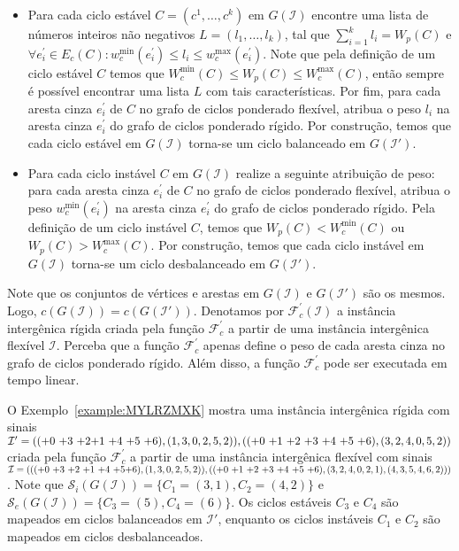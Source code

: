 \begin{itemize}
  \item Para cada ciclo estável $C=(c^1,\dots,c^k)$ em $G(\mathcal{I})$ encontre uma lista de números inteiros não negativos $L=(l_1,\dots,l_k)$, tal que $\sum_{i=1}^{k}l_i = W_p(C)$ e $\forall e^{\prime}_i \in E_c(C): w^{\min}_c(e^{\prime}_i) \le l_i \le w^{\max}_c(e^{\prime}_i)$. Note que pela definição de um ciclo estável $C$ temos que $W^{\min}_c(C) \le W_p(C) \le W^{\max}_c(C)$, então sempre é possível encontrar uma lista $L$ com tais características. Por fim, para cada aresta cinza $e^{\prime}_i$ de $C$ no grafo de ciclos ponderado flexível, atribua o peso $l_i$ na aresta cinza $e^{\prime}_i$ do grafo de ciclos ponderado rígido. Por construção, temos que cada ciclo estável em $G(\mathcal{I})$ torna-se um ciclo balanceado em $G(\mathcal{I}')$.
  \item Para cada ciclo instável $C$ em $G(\mathcal{I})$ realize a seguinte atribuição de peso: para cada aresta cinza $e^{\prime}_i$ de $C$ no grafo de ciclos ponderado flexível, atribua o peso $w^{\min}_c(e^{\prime}_i)$ na aresta cinza $e^{\prime}_i$ do grafo de ciclos ponderado rígido. Pela definição de um ciclo instável $C$, temos que $W_p(C)  < W^{\min}_c(C)$ ou $W_p(C) > W^{\max}_c(C)$. Por construção, temos que cada ciclo instável em $G(\mathcal{I})$ torna-se um ciclo desbalanceado em $G(\mathcal{I}')$.
\end{itemize}

Note que os conjuntos de vértices e arestas em $G(\mathcal{I})$ e $G(\mathcal{I}')$ são os mesmos. Logo, $c(G(\mathcal{I})) = c(G(\mathcal{I}'))$. Denotamos por $\mathcal{F}_{c}^{'}(\mathcal{I})$ a instância intergênica rígida criada pela função $\mathcal{F}_{c}^{'}$ a partir de uma instância intergênica flexível $\mathcal{I}$. Perceba que a função $\mathcal{F}_{c}^{'}$ apenas define o peso de cada aresta cinza no grafo de ciclos ponderado rígido. Além disso, a função $\mathcal{F}_{c}^{'}$ pode ser executada em tempo linear.

O Exemplo~\ref{example:MYLRZMXK} mostra uma instância intergênica rígida com sinais $\mathcal{I}' = (({+0}~{+3}~{+2}\break{+1}~{+4}~{+5}~{+6}),(1,3,0,2,5,2)),(({+0}~{+1}~{+2}~{+3}~{+4}~{+5}~{+6}),(3,2,4,0,5,2))$ criada pela função $\mathcal{F}_{c}^{'}$ a partir de uma instância intergênica flexível com sinais $\mathcal{I} = ((({+0}~{+3}~{+2}~{+1}~{+4}~{+5}\break{+6}),(1,3,0,2,5,2)),(({+0}~{+1}~{+2}~{+3}~{+4}~{+5}~{+6}),(3,2,4,0,2,1),(4,3,5,4,6,2)))$. Note que $\mathcal{S}_i(G(\mathcal{I})) = \{C_1=(3,1),C_2=(4,2)\}$ e $\mathcal{S}_e(G(\mathcal{I})) = \{C_3=(5),C_4=(6)\}$. Os ciclos estáveis $C_3$ e $C_4$ são mapeados em ciclos balanceados em $\mathcal{I}'$, enquanto os ciclos instáveis $C_1$ e $C_2$ são mapeados em ciclos desbalanceados.

